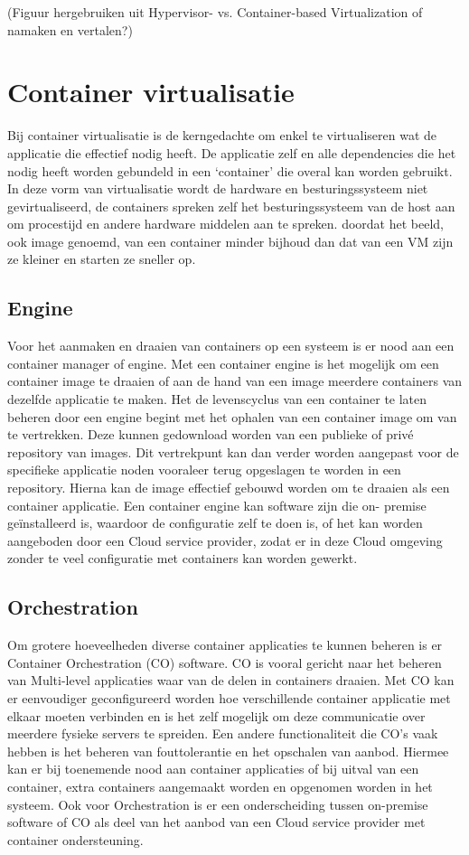 (Figuur hergebruiken uit Hypervisor- vs. Container-based Virtualization of namaken en vertalen?)


\section{Container virtualisatie}
Bij container virtualisatie is de kerngedachte om enkel te virtualiseren wat de applicatie die effectief nodig heeft. De applicatie zelf en alle dependencies die het nodig heeft worden gebundeld in een ‘container’ die overal kan worden gebruikt. In deze vorm van virtualisatie wordt de hardware en besturingssysteem niet gevirtualiseerd, de containers spreken zelf het besturingssysteem van de host aan om procestijd en andere hardware middelen aan te spreken. doordat het beeld, ook image genoemd, van een container minder bijhoud dan dat van een VM zijn ze kleiner en starten ze sneller op. \autocite{Eder2016,jangala2018}

\subsection{Engine}
Voor het aanmaken en draaien van containers op een systeem is er nood aan een container manager of engine. Met een container engine is het mogelijk om een container image te draaien of aan de hand van een image meerdere containers van dezelfde applicatie te maken. Het de levenscyclus van een container te laten beheren door een engine begint met het ophalen van een container image om van te vertrekken. Deze kunnen gedownload worden van een publieke of privé repository van images. Dit vertrekpunt kan dan verder worden aangepast voor de specifieke applicatie noden vooraleer terug opgeslagen te worden in een repository. Hierna kan de image effectief gebouwd worden om te draaien als een container applicatie. Een container engine kan software zijn die on- premise geïnstalleerd is, waardoor de configuratie zelf te doen is, of het kan worden aangeboden door een Cloud service provider, zodat er in deze Cloud omgeving zonder te veel configuratie met containers kan worden gewerkt. \autocite{Casalicchio2020}
\subsection{Orchestration}
Om grotere hoeveelheden diverse container applicaties te kunnen beheren is er Container Orchestration (CO) software. CO is vooral gericht naar het beheren van Multi-level applicaties waar van de delen in containers draaien. Met CO kan er eenvoudiger geconfigureerd worden hoe verschillende container applicatie met elkaar moeten verbinden en is het zelf mogelijk om deze communicatie over meerdere fysieke servers te spreiden. Een andere functionaliteit die CO’s vaak hebben is het beheren van fouttolerantie en het opschalen van aanbod. Hiermee kan er bij toenemende nood aan container applicaties of  bij uitval van een container, extra containers aangemaakt worden en opgenomen worden in het systeem. Ook voor Orchestration is er een onderscheiding tussen on-premise software of CO als deel van het aanbod van een Cloud service provider met container ondersteuning.\autocite{Casalicchio2020,Truyen2019}

